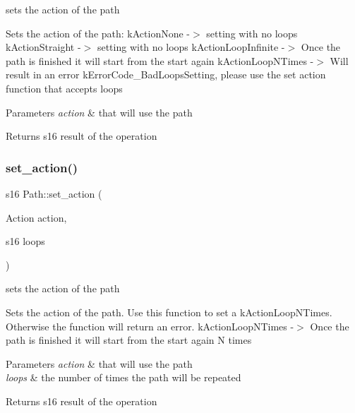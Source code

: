 sets the action of the path 

Sets the action of the path\+: k\+Action\+None -\/$>$ setting with no loops k\+Action\+Straight -\/$>$ setting with no loops k\+Action\+Loop\+Infinite -\/$>$ Once the path is finished it will start from the start again k\+Action\+Loop\+N\+Times -\/$>$ Will result in an error k\+Error\+Code\+\_\+\+Bad\+Loops\+Setting, please use the set action function that accepts loops


\begin{DoxyParams}{Parameters}
{\em action} & that will use the path \\
\hline
\end{DoxyParams}
\begin{DoxyReturn}{Returns}
s16 result of the operation 
\end{DoxyReturn}
\mbox{\label{class_path_a9932d1c9742ab5c9bf1d2fea0536c0ad}} 
\subsubsection{\texorpdfstring{set\+\_\+action()}{set\_action()}\hspace{0.1cm}{\footnotesize\ttfamily [2/2]}}
{\footnotesize\ttfamily s16 Path\+::set\+\_\+action (\begin{DoxyParamCaption}\item[{Action}]{action,  }\item[{s16}]{loops }\end{DoxyParamCaption})}



sets the action of the path 

Sets the action of the path. Use this function to set a k\+Action\+Loop\+N\+Times. Otherwise the function will return an error. k\+Action\+Loop\+N\+Times -\/$>$ Once the path is finished it will start from the start again N times


\begin{DoxyParams}{Parameters}
{\em action} & that will use the path \\
\hline
{\em loops} & the number of times the path will be repeated \\
\hline
\end{DoxyParams}
\begin{DoxyReturn}{Returns}
s16 result of the operation 
\end{DoxyReturn}
\mbox{\label{class_path_a7569f8a9cfbba8324ea9029db7afe7fc}} 
